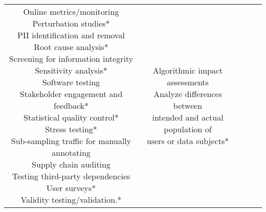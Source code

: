 \documentclass[fleqn]{article}
\begin{document}
\begin{landscape}
\begin{table}[H]
\begin{tabular}{|c|c|c|c|c|}
{			\textbullet\hspace{3pt} Online metrics/monitoring \\ 
			\textbullet\hspace{3pt} Perturbation studies*\\ 
			\textbullet\hspace{3pt} PII identification and removal \\ 
			\textbullet\hspace{3pt} Root cause analysis*\\ 
			\textbullet\hspace{3pt} Screening for information integrity \\ 
			\textbullet\hspace{3pt} Sensitivity analysis*\\ 
			\textbullet\hspace{3pt} Software testing \\ 
			\textbullet\hspace{3pt} Stakeholder engagement and feedback*\\ 
			\textbullet\hspace{3pt} Statistical quality control*\\ 
			\textbullet\hspace{3pt} Stress testing*\\ 
			\textbullet\hspace{3pt} Sub-sampling traffic for manually annotating \\ 
			\textbullet\hspace{3pt} Supply chain auditing \\ 
			\textbullet\hspace{3pt} Testing third-party dependencies \\ 
			\textbullet\hspace{3pt} User surveys*\\ 
			\textbullet\hspace{3pt} Validity testing/validation.* \\	
		}	
		&
		\makecell[l]{ 	
			\textbullet\hspace{3pt} Algorithmic impact assessments\\  	
			\textbullet\hspace{3pt} Analyze differences between \\\hspace{10pt}intended and actual population of \\\hspace{10pt}users or data subjects*\\ 	
}
\end{tabular}
\end{table}
\end{landscape}
\end{document}
